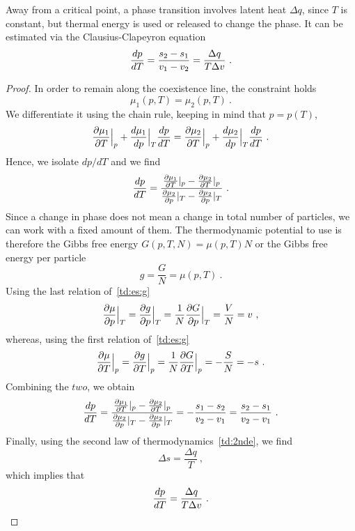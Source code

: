     Away from a critical point, a phase transition involves latent heat $\Delta q$, since $T$ is constant, but thermal energy is used or released to change the phase. It can be estimated via the Clausius-Clapeyron equation
    \begin{equation}\label{ph:cceq}
        \frac{dp}{dT} = \frac{s_2 - s_1}{v_1 - v_2} = \frac{\Delta q}{T \Delta v}  ~.
    \end{equation}
    \begin{proof}
        In order to remain along the coexistence line, the constraint holds
        \begin{equation*}
            \mu_1(p, T) = \mu_2 (p, T) ~.
        \end{equation*}
        We differentiate it using the chain rule, keeping in mind that $p = p(T)$,
        \begin{equation*}
            \frac{\partial\mu_1}{\partial T} \Big \vert_p + \frac{d\mu_1}{dp} \Big \vert_T \frac{dp}{dT} = \frac{\partial\mu_2}{\partial T} \Big \vert_p + \frac{d\mu_2}{dp} \Big \vert_T \frac{dp}{dT} ~.
        \end{equation*}
        Hence, we isolate $dp/dT$ and we find
        \begin{equation*}
            \frac{dp}{dT} = \frac{\frac{\partial\mu_1}{\partial T} \vert_p - \frac{\partial\mu_2}{\partial T} \vert_p}{\frac{\partial\mu_2}{\partial p} \vert_T - \frac{\partial\mu_2}{\partial p} \vert_T} ~.
        \end{equation*}
        Since a change in phase does not mean a change in total number of particles, we can work with a fixed amount of them. The thermodynamic potential to use is therefore the Gibbs free energy $G(p, T, N) = \mu (p, T) N$ or the Gibbs free energy per particle 
        \begin{equation*}
            g = \frac{G}{N} = \mu(p,T) ~.
        \end{equation*}
        Using the last relation of~\eqref{td:es:g}
        \begin{equation*}
            \frac{\partial\mu}{\partial p} \Big \vert_T = \frac{\partial g}{\partial p} \Big \vert_T = \frac{1}{N} \frac{\partial G}{\partial p} \Big \vert_T = \frac{V}{N} = v ~,
        \end{equation*}
        whereas, using the first relation of~\eqref{td:es:g}
        \begin{equation*}
            \frac{\partial\mu}{\partial T} \Big \vert_p = \frac{\partial g}{\partial T} \Big \vert_p = \frac{1}{N} \frac{\partial G}{\partial T} \Big \vert_p = - \frac{S}{N} = - s ~.
        \end{equation*}
        Combining the $two$, we obtain
        \begin{equation*}
            \frac{dp}{dT} = \frac{\frac{\partial\mu_1}{\partial T} \vert_p - \frac{\partial\mu_2}{\partial T} \vert_p}{\frac{\partial\mu_2}{\partial p} \vert_T - \frac{\partial\mu_2}{\partial p} \vert_T} = - \frac{s_1 - s_2}{v_2 - v_1} = \frac{s_2 - s_1}{v_2 - v_1} ~.
        \end{equation*}
        Finally, using the second law of thermodynamics~\eqref{td:2nde}, we find
        \begin{equation*}
            \Delta s = \frac{\Delta q}{T} ~,
        \end{equation*}
        which implies that
        \begin{equation*}
            \frac{dp}{dT} = \frac{\Delta q}{T \Delta v} ~.
        \end{equation*}
    \end{proof}
